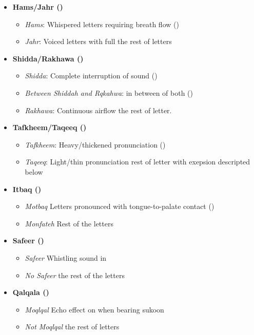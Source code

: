 \begin{itemize}
\item \textbf{Hams/Jahr ()}
\begin{itemize}
  \item \textit{Hams}: Whispered letters requiring breath flow ()
  \item \textit{Jahr}: Voiced letters with full the rest of letters
\end{itemize}

\item \textbf{Shidda/Rakhawa ()}
\begin{itemize}
  \item \textit{Shidda}: Complete interruption of sound ()
  \item \textit{Between Shiddah and Rqkahwa}: in between of both ()
  \item \textit{Rakhawa}: Continuous airflow the rest of letter.
\end{itemize}

\item \textbf{Tafkheem/Taqeeq ()}
\begin{itemize}
  \item \textit{Tafkheem}: Heavy/thickened pronunciation ()
  \item \textit{Taqeeq}: Light/thin pronunciation rest of letter with exepsion descripted below
\end{itemize}

\item \textbf{Itbaq ()}
\begin{itemize}
  \item \textit{Motbaq} Letters pronounced with tongue-to-palate contact ()
  \item \textit{Monfateh} Rest of the letters
\end{itemize}

\item \textbf{Safeer ()}
\begin{itemize}
  \item \textit{Safeer} Whistling sound in 
  \item \textit{No Safeer} the rest of the letters
\end{itemize}

\item \textbf{Qalqala ()}
\begin{itemize}
  \item \textit{Moqlqal} Echo effect on  when bearing sukoon
  \item \textit{Not Moqlqal} the rest of letters
\end{itemize}


\end{itemize}
